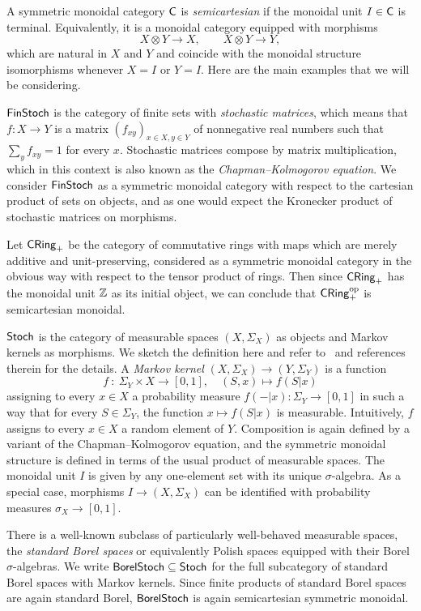\documentclass[11pt]{article}
\begin{document}
A symmetric monoidal category $\mathsf{C}$ is \emph{semicartesian} if the monoidal unit $I \in \mathsf{C}$ is terminal. Equivalently, it is a monoidal category equipped with morphisms
\[
	X \otimes Y \longrightarrow X, \qquad X \otimes Y \longrightarrow Y,
\]
which are natural in $X$ and $Y$ and coincide with the monoidal structure isomorphisms whenever $X = I$ or $Y = I$. Here are the main examples that we will be considering.

\begin{example}
	\label{finstoch}
	$\operatorname{\mathsf{FinStoch}}$ is the category of finite sets with \emph{stochastic matrices}, which means that $f : X \to Y$ is a matrix $(f_{xy})_{x \in X,y \in Y}$ of nonnegative real numbers such that $\sum_y f_{xy} = 1$ for every $x$. Stochastic matrices compose by matrix multiplication, which in this context is also known as the \emph{Chapman--Kolmogorov equation}. We consider $\operatorname{\mathsf{FinStoch}}$ as a symmetric monoidal category with respect to the cartesian product of sets on objects, and as one would expect the Kronecker product of stochastic matrices on morphisms.
\end{example}

\begin{example}
	\label{cring}
	Let $\operatorname{\mathsf{CRing}}_+$ be the category of commutative rings with maps which are merely additive and unit-preserving, considered as a symmetric monoidal category in the obvious way with respect to the tensor product of rings. Then since $\operatorname{\mathsf{CRing}}_+$ has the monoidal unit $\mathbb{Z}$ as its initial object, we can conclude that $\operatorname{\mathsf{CRing}}_+^{\mathrm{op}}$ is semicartesian monoidal.
\end{example}

\begin{example}
	\label{stoch}
	$\operatorname{\mathsf{Stoch}}$ is the category of measurable spaces $(X,\Sigma_X)$ as objects and Markov kernels as morphisms. We sketch the definition here and refer to~\cite[Section~4]{markov_cats} and references therein for the details. A \emph{Markov kernel} $(X,\Sigma_X) \to (Y,\Sigma_Y)$ is a function
	\[
		f \: : \: \Sigma_Y \times X \longrightarrow [0,1], \quad (S,x) \longmapsto f(S|x)
	\]
	assigning to every $x \in X$ a probability measure $f(-|x) : \Sigma_Y \to [0,1]$ in such a way that for every $S \in \Sigma_Y$, the function $x \mapsto f(S|x)$ is measurable. Intuitively, $f$ assigns to every $x \in X$ a random element of $Y$. Composition is again defined by a variant of the Chapman--Kolmogorov equation, and the symmetric monoidal structure is defined in terms of the usual product of measurable spaces. The monoidal unit $I$ is given by any one-element set with its unique $\sigma$-algebra. As a special case, morphisms $I \to (X,\Sigma_X)$ can be identified with probability measures $\sigma_X \to [0,1]$.

	There is a well-known subclass of particularly well-behaved measurable spaces, the \emph{standard Borel spaces} or equivalently Polish spaces equipped with their Borel $\sigma$-algebras. We write $\operatorname{\mathsf{BorelStoch}} \subseteq \operatorname{\mathsf{Stoch}}$ for the full subcategory of standard Borel spaces with Markov kernels. Since finite products of standard Borel spaces are again standard Borel, $\operatorname{\mathsf{BorelStoch}}$ is again semicartesian symmetric monoidal.
\end{example}
\end{document}
